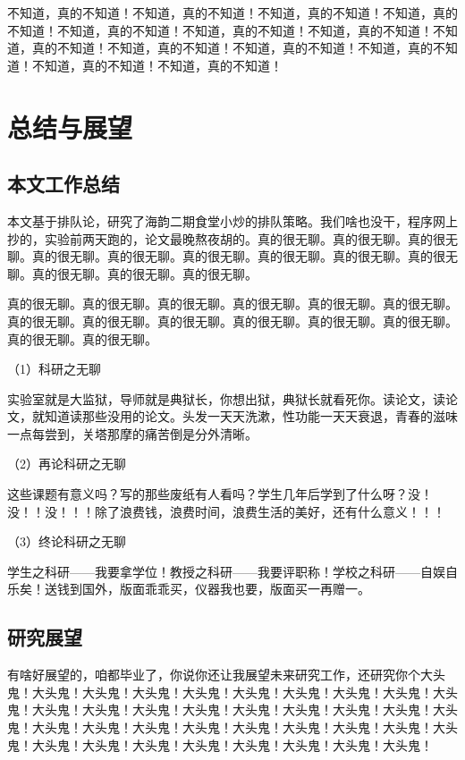 \documentclass[a4paper,12pt]{book} %
\begin{document}
不知道，真的不知道！不知道，真的不知道！不知道，真的不知道！不知道，真的不知道！不知道，真的不知道！不知道，真的不知道！不知道，真的不知道！不知道，真的不知道！不知道，真的不知道！不知道，真的不知道！不知道，真的不知道！不知道，真的不知道！不知道，真的不知道！

\clearpage{\pagestyle{empty}\cleardoublepage}


\chapter{总结与展望}
\section{本文工作总结}
本文基于排队论，研究了海韵二期食堂小炒的排队策略。我们啥也没干，程序网上抄的，实验前两天跑的，论文最晚熬夜胡的。真的很无聊。真的很无聊。真的很无聊。真的很无聊。真的很无聊。真的很无聊。真的很无聊。真的很无聊。真的很无聊。真的很无聊。真的很无聊。真的很无聊。

真的很无聊。真的很无聊。真的很无聊。真的很无聊。真的很无聊。真的很无聊。真的很无聊。真的很无聊。真的很无聊。真的很无聊。真的很无聊。真的很无聊。真的很无聊。真的很无聊。

（1）科研之无聊

实验室就是大监狱，导师就是典狱长，你想出狱，典狱长就看死你。读论文，读论文，就知道读那些没用的论文。头发一天天洗漱，性功能一天天衰退，青春的滋味一点每尝到，关塔那摩的痛苦倒是分外清晰。

（2）再论科研之无聊

这些课题有意义吗？写的那些废纸有人看吗？学生几年后学到了什么呀？没！没！！没！！！除了浪费钱，浪费时间，浪费生活的美好，还有什么意义！！！

（3）终论科研之无聊

学生之科研——我要拿学位！教授之科研——我要评职称！学校之科研——自娱自乐矣！送钱到国外，版面乖乖买，仪器我也要，版面买一再赠一。

\section{研究展望}
有啥好展望的，咱都毕业了，你说你还让我展望未来研究工作，还研究你个大头鬼！大头鬼！大头鬼！大头鬼！大头鬼！大头鬼！大头鬼！大头鬼！大头鬼！大头鬼！大头鬼！大头鬼！大头鬼！大头鬼！大头鬼！大头鬼！大头鬼！大头鬼！大头鬼！大头鬼！大头鬼！大头鬼！大头鬼！大头鬼！大头鬼！大头鬼！大头鬼！大头鬼！大头鬼！大头鬼！大头鬼！大头鬼！大头鬼！大头鬼！大头鬼！大头鬼！
\end{document}
